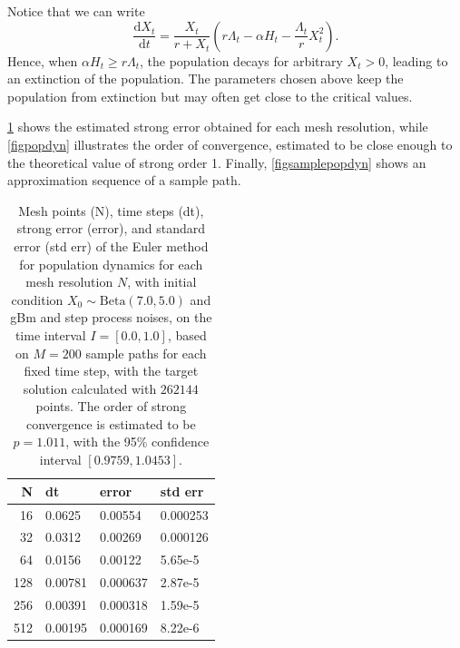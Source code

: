 \documentclass[reqno,12pt]{amsart}
\theoremstyle{plain} %
\theoremstyle{definition} %
\begin{document}
Notice that we can write
\[
    \frac{\mathrm{d}X_t}{\mathrm{d}t} = \frac{X_t}{r + X_t} \left(r\Lambda_t - \alpha H_t - \frac{\Lambda_t}{r} X_t^2\right).
\]
Hence, when $\alpha H_t \geq r\Lambda_t$, the population decays for arbitrary $X_t > 0$, leading to an extinction of the population. The parameters chosen above keep the population from extinction but may often get close to the critical values.

\cref{tabpopdyn} shows the estimated strong error obtained for each mesh resolution, while \cref{figpopdyn} illustrates the order of convergence, estimated to be close enough to the theoretical value of strong order 1. Finally, \cref{figsamplepopdyn} shows an approximation sequence of a sample path.

\begin{table}
    \begin{tabular}[htb]{|r|l|l|l|}
        \hline N & dt & error & std err \\
        \hline \hline
        16 & 0.0625 & 0.00554 & 0.000253 \\
        32 & 0.0312 & 0.00269 & 0.000126 \\
        64 & 0.0156 & 0.00122 & 5.65e-5 \\
        128 & 0.00781 & 0.000637 & 2.87e-5 \\
        256 & 0.00391 & 0.000318 & 1.59e-5 \\
        512 & 0.00195 & 0.000169 & 8.22e-6 \\
        \hline
    \end{tabular}
    \bigskip

    \caption{Mesh points (N), time steps (dt), strong error (error), and standard error (std err) of the Euler method for population dynamics for each mesh resolution $N$, with initial condition $X_0 \sim \mathrm{Beta}(7.0, 5.0)$ and gBm and step process noises, on the time interval $I = [0.0, 1.0]$, based on $M = 200$ sample paths for each fixed time step, with the target solution calculated with $262144$ points. The order of strong convergence is estimated to be $p = 1.011$, with the 95\% confidence interval $[0.9759, 1.0453]$.}
    \label{tabpopdyn}
\end{table}
\end{document}
